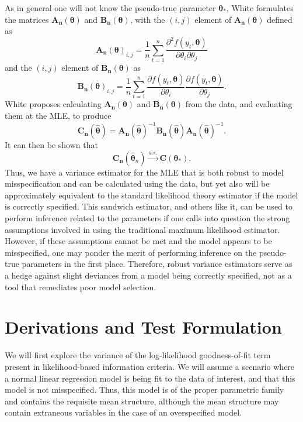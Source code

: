\documentclass[review]{elsarticle}
\begin{document}
		As in general one will not know the pseudo-true parameter $\bm{\theta}_*$, White formulates the matrices $\bm{A_n}(\bm{\theta})$ and $\bm{B_n}(\bm{\theta})$, with the $(i,j)$ element of $\bm{A_n}(\bm{\theta})$ defined as
		\begin{equation*}
			\bm{A_n}(\bm{\theta})_{i,j} = \frac{1}{n} \sum_{t=1}^{n} \frac{\partial^2 f(y_t,\bm{\theta})}{\partial \theta_i \partial \theta_j}
		\end{equation*}
		and the $(i,j)$ element of $\bm{B_n}(\bm{\theta})$ as
		\begin{equation*}
			\bm{B_n}(\bm{\theta})_{i,j} = \frac{1}{n} \sum_{t=1}^{n} \frac{\partial f(y_t,\bm{\theta})}{\partial \theta_i} \frac{\partial f(y_t,\bm{\theta})}{\partial \theta_j} .
		\end{equation*}
		White proposes calculating $\bm{A_n}(\bm{\theta})$ and $\bm{B_n}(\bm{\theta})$ from the data, and evaluating them at the MLE, to produce
		\begin{equation*}
			\bm{C_n}(\hat{\bm{\theta}}) = \bm{A_n}(\hat{\bm{\theta}})^{-1} \bm{B_n}(\hat{\bm{\theta}}) \bm{A_n}(\hat{\bm{\theta}})^{-1} .
		\end{equation*}
		It can then be shown that 
		\begin{equation*}
			\bm{C_n}(\hat{\bm{\theta}}_n) \xrightarrow[]{a.s.} \bm{C}(\bm{\theta}_* ) .
		\end{equation*}
		Thus, we have a variance estimator for the MLE that is both robust to model misspecification and can be calculated using the data, but yet also will be approximately equivalent to the standard
		likelihood theory estimator if the model is correctly specified. This sandwich estimator, and others like it, can be used to perform inference related to the parameters if one calls into question
		the strong assumptions involved in using the traditional maximum likelihood estimator. However, if these assumptions cannot be met and the model appears to be misspecified, one may ponder
		the merit of performing inference on the pseudo-true parameters in the first place. Therefore, robust variance estimators serve as a hedge against slight deviances from a model
		being correctly specified, not as a tool that remediates poor model selection.

\section{Derivations and Test Formulation}
		
		We will first explore the variance of the log-likelihood goodness-of-fit term present in likelihood-based information criteria. We will assume a
		scenario where a normal linear regression model is being fit to the data of interest, and that this model is not misspecified. Thus, this model is of the proper
		parametric family and contains the requisite mean structure, although the mean structure may contain extraneous variables in the
		case of an overspecified model.
\end{document}
